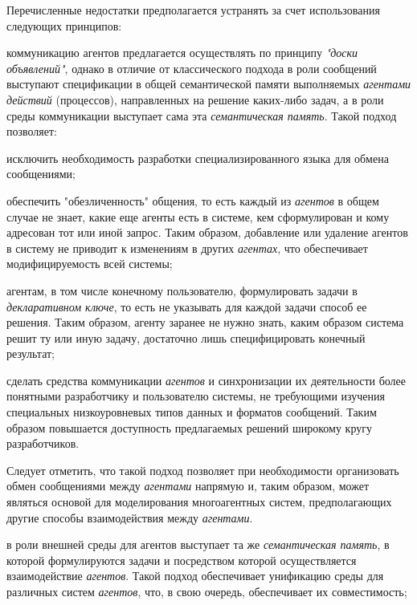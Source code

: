 Перечисленные недостатки предполагается устранять за счет использования следующих принципов:
\begin{textitemize}
\item коммуникацию агентов предлагается осуществлять по принципу \textit{"доски объявлений"{}}, однако в отличие от классического подхода в роли сообщений выступают спецификации в общей семантической памяти выполняемых \textit{агентами} \textit{действий} (процессов), направленных на решение каких-либо задач, а в роли среды коммуникации выступает сама эта \textit{семантическая память}. Такой подход позволяет: 
	\begin{textitemize}
	\item исключить необходимость разработки специализированного языка для обмена сообщениями;
	\item обеспечить "обезличенность"{} общения, то есть каждый из \textit{агентов} в общем случае не знает, какие еще агенты есть в системе, кем сформулирован и кому адресован тот или иной запрос. Таким образом, добавление или удаление агентов в систему не приводит к изменениям в других \textit{агентах}, что обеспечивает модифицируемость всей системы;
	\item агентам, в том числе конечному пользователю, формулировать задачи в \textit{декларативном ключе}, то есть не указывать для каждой задачи способ ее решения. Таким образом, агенту заранее не нужно знать, каким образом система решит ту или иную задачу, достаточно лишь специфицировать конечный результат;
	\item сделать средства коммуникации \textit{агентов} и синхронизации их деятельности более понятными разработчику и пользователю системы, не требующими изучения специальных низкоуровневых типов данных и форматов сообщений. Таким образом повышается доступность предлагаемых решений широкому кругу разработчиков.
	\end{textitemize}
\vspace{-2\parskip}
Следует отметить, что такой подход позволяет при необходимости организовать обмен сообщениями между \textit{агентами} напрямую и, таким образом, может являться основой для моделирования многоагентных систем, предполагающих другие способы взаимодействия между \textit{агентами}.
\vspace{\parskip}
\item в роли внешней среды для агентов выступает та же \textit{семантическая память}, в которой формулируются задачи и посредством которой осуществляется взаимодействие \textit{агентов}. Такой подход обеспечивает унификацию среды для различных систем \textit{агентов}, что, в свою очередь, обеспечивает их совместимость;

\end{textitemize}
